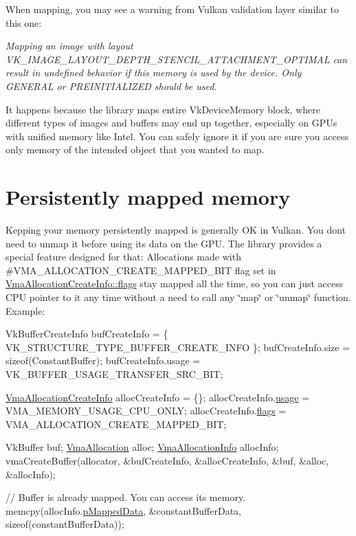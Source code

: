 When mapping, you may see a warning from Vulkan validation layer similar to this one\+:

{\itshape Mapping an image with layout V\+K\+\_\+\+I\+M\+A\+G\+E\+\_\+\+L\+A\+Y\+O\+U\+T\+\_\+\+D\+E\+P\+T\+H\+\_\+\+S\+T\+E\+N\+C\+I\+L\+\_\+\+A\+T\+T\+A\+C\+H\+M\+E\+N\+T\+\_\+\+O\+P\+T\+I\+M\+AL can result in undefined behavior if this memory is used by the device. Only G\+E\+N\+E\+R\+AL or P\+R\+E\+I\+N\+I\+T\+I\+A\+L\+I\+Z\+ED should be used.}

It happens because the library maps entire {\ttfamily Vk\+Device\+Memory} block, where different types of images and buffers may end up together, especially on G\+P\+Us with unified memory like Intel. You can safely ignore it if you are sure you access only memory of the intended object that you wanted to map.\hypertarget{memory_mapping_memory_mapping_persistently_mapped_memory}{}\section{Persistently mapped memory}\label{memory_mapping_memory_mapping_persistently_mapped_memory}
Kepping your memory persistently mapped is generally OK in Vulkan. You don\textquotesingle{}t need to unmap it before using its data on the G\+PU. The library provides a special feature designed for that\+: Allocations made with \#\+V\+M\+A\+\_\+\+A\+L\+L\+O\+C\+A\+T\+I\+O\+N\+\_\+\+C\+R\+E\+A\+T\+E\+\_\+\+M\+A\+P\+P\+E\+D\+\_\+\+B\+IT flag set in \hyperlink{structVmaAllocationCreateInfo_add09658ac14fe290ace25470ddd6d41b}{Vma\+Allocation\+Create\+Info\+::flags} stay mapped all the time, so you can just access C\+PU pointer to it any time without a need to call any \char`\"{}map\char`\"{} or \char`\"{}unmap\char`\"{} function. Example\+:


\begin{DoxyCode}
VkBufferCreateInfo bufCreateInfo = \{ VK\_STRUCTURE\_TYPE\_BUFFER\_CREATE\_INFO \};
bufCreateInfo.size = \textcolor{keyword}{sizeof}(ConstantBuffer);
bufCreateInfo.usage = VK\_BUFFER\_USAGE\_TRANSFER\_SRC\_BIT;

\hyperlink{structVmaAllocationCreateInfo}{VmaAllocationCreateInfo} allocCreateInfo = \{\};
allocCreateInfo.\hyperlink{structVmaAllocationCreateInfo_accb8b06b1f677d858cb9af20705fa910}{usage} = VMA\_MEMORY\_USAGE\_CPU\_ONLY;
allocCreateInfo.\hyperlink{structVmaAllocationCreateInfo_add09658ac14fe290ace25470ddd6d41b}{flags} = VMA\_ALLOCATION\_CREATE\_MAPPED\_BIT;

VkBuffer buf;
\hyperlink{structVmaAllocation}{VmaAllocation} alloc;
\hyperlink{structVmaAllocationInfo}{VmaAllocationInfo} allocInfo;
vmaCreateBuffer(allocator, &bufCreateInfo, &allocCreateInfo, &buf, &alloc, &allocInfo);

\textcolor{comment}{// Buffer is already mapped. You can access its memory.}
memcpy(allocInfo.\hyperlink{structVmaAllocationInfo_a5eeffbe2d2f30f53370ff14aefbadbe2}{pMappedData}, &constantBufferData, \textcolor{keyword}{sizeof}(constantBufferData));
\end{DoxyCode}



